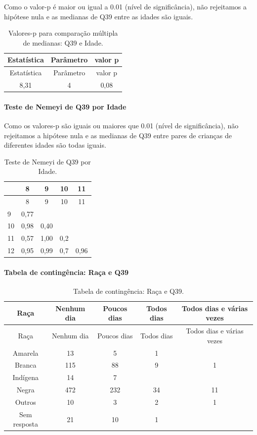 \documentclass[]{article}
\let\oldparagraph\paragraph
\renewcommand{\paragraph}[1]{\oldparagraph{#1}\mbox{}}
\begin{document}
Como o valor-p é maior ou igual a 0.01 (nível de significância), não rejeitamos a hipótese nula e as medianas de Q39 entre as idades são iguais.

\begin{longtable}[]{@{}ccc@{}}
\caption{\label{tab:unnamed-chunk-1515}Valores-p para comparação múltipla de medianas: Q39 e Idade.}\tabularnewline
\toprule
Estatística & Parâmetro & valor p\tabularnewline
\midrule
\endfirsthead
\toprule
Estatística & Parâmetro & valor p\tabularnewline
\midrule
\endhead
8,31 & 4 & 0,08\tabularnewline
\bottomrule
\end{longtable}

\hypertarget{teste-de-nemeyi-de-q39-por-idade}{%
\paragraph{Teste de Nemeyi de Q39 por Idade}\label{teste-de-nemeyi-de-q39-por-idade}}

Como os valores-p são iguais ou maiores que 0.01 (nível de significância), não rejeitamos a hipótese nula e as medianas de Q39 entre pares de crianças de diferentes idades são todas iguais.

\begin{longtable}[]{@{}lcccc@{}}
\caption{\label{tab:unnamed-chunk-1517}Teste de Nemeyi de Q39 por Idade.}\tabularnewline
\toprule
& 8 & 9 & 10 & 11\tabularnewline
\midrule
\endfirsthead
\toprule
& 8 & 9 & 10 & 11\tabularnewline
\midrule
\endhead
9 & 0,77 & & &\tabularnewline
10 & 0,98 & 0,40 & &\tabularnewline
11 & 0,57 & 1,00 & 0,2 &\tabularnewline
12 & 0,95 & 0,99 & 0,7 & 0,96\tabularnewline
\bottomrule
\end{longtable}

\cleardoublepage

\hypertarget{tabela-de-continguxeancia-rauxe7a-e-q39}{%
\paragraph{Tabela de contingência: Raça e Q39}\label{tabela-de-continguxeancia-rauxe7a-e-q39}}

\begin{longtable}[]{@{}ccccc@{}}
\caption{\label{tab:unnamed-chunk-1518}Tabela de contingência: Raça e Q39.}\tabularnewline
\toprule
Raça & Nenhum dia & Poucos dias & Todos dias & Todos dias e várias vezes\tabularnewline
\midrule
\endfirsthead
\toprule
Raça & Nenhum dia & Poucos dias & Todos dias & Todos dias e várias vezes\tabularnewline
\midrule
\endhead
Amarela & 13 & 5 & 1 &\tabularnewline
Branca & 115 & 88 & 9 & 1\tabularnewline
Indígena & 14 & 7 & &\tabularnewline
Negra & 472 & 232 & 34 & 11\tabularnewline
Outros & 10 & 3 & 2 & 1\tabularnewline
Sem resposta & 21 & 10 & 1 &\tabularnewline
\bottomrule
\end{longtable}
\end{document}
